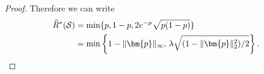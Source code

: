 \documentclass[letterpaper]{article} %
\newcommand{\bx}{{\bm{x}}}
\newcommand{\bp}{{\bm{p}}}
\newcommand{\cS}{{\cal{S}}}
\newcommand{\cD}{{\cal{D}}}
\newcommand{\WS}{{W_{\cal{S}}}}
\begin{document}
\begin{proof}
    Therefore we can write
    \begin{align*}
        \widehat{R}^*(\cS) &= \min\{p,1-p,2e^{-\mu}\sqrt{p(1-p)}\}
        \\
        &= \min\left\{1-\|\bp\|_\infty,\, \lambda\sqrt{(1-\|\bp\|_2^2)/2} \right\}. \qedhere
    \end{align*}

\end{proof}
\end{document}
